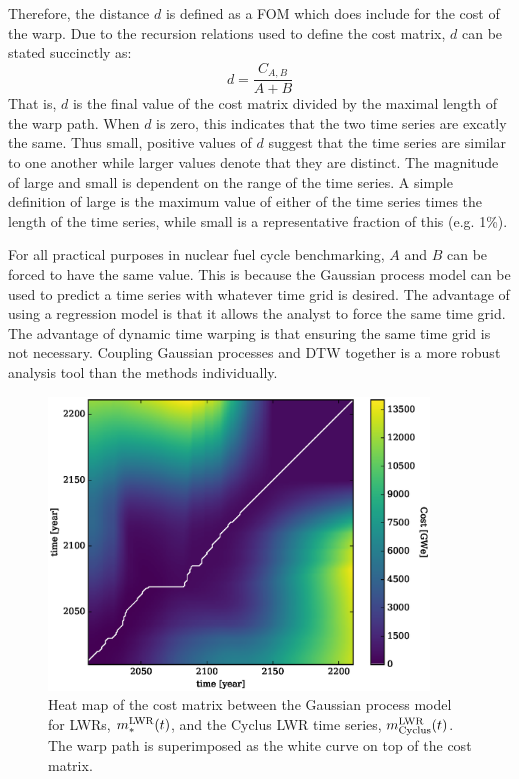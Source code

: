 Therefore, the distance $d$ is defined as a FOM which does include for the cost of the
warp.  Due to the recursion relations used to define the cost matrix, $d$ can be 
stated succinctly as:
\begin{equation}
\label{d-calc}
d = \frac{C_{A,B}}{A + B}
\end{equation}
That is, $d$ is the final value of the cost matrix divided by the maximal length 
of the warp path. When $d$ is zero, this indicates that the two time series
are excatly the same. Thus small, positive values of $d$ suggest that the 
time series are similar to one another while larger values denote that they 
are distinct. The magnitude of large and small is dependent on the range of 
the time series. A simple definition of large is the maximum 
value of either of the time series times the length of the time series, 
while small is a representative fraction of this (e.g. 1\%).

For all practical purposes in nuclear fuel cycle benchmarking, $A$ and $B$ can be 
forced to have the same
value. This is because the Gaussian process model can be used to predict a time series 
with whatever time grid is desired.  The advantage of using a regression model 
is that it allows the analyst to force the same time grid.  The advantage of 
dynamic time warping is that ensuring the same time grid is not necessary.
Coupling Gaussian processes and DTW together is a more robust analysis tool 
than the methods individually.

\begin{figure}[htb]
\centering
\includegraphics[width=0.9\textwidth]{cost-lwr-model-to-lwr-cyclus.eps}
\caption{Heat map of the cost matrix between the Gaussian process model 
for LWRs, $m_*^{\mathrm{LWR}}(t)$, and the Cyclus LWR time series, $m_{\mathrm{Cyclus}}^{\mathrm{LWR}}(t)$.
The warp path is superimposed as the white curve on top of the cost matrix.}
\label{cost-lwr-model-to-lwr-cyclus}
\end{figure}

